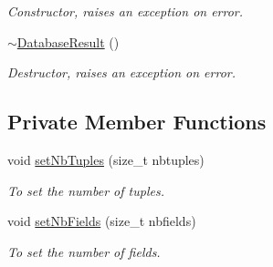 \begin{DoxyCompactItemize}
\begin{DoxyCompactList}\small\item\em Constructor, raises an exception on error. \item\end{DoxyCompactList}\item 
\hypertarget{classDatabaseResult_a67e279aafefdea3dcf1a61540dfa6c8b}{
\hyperlink{classDatabaseResult_a67e279aafefdea3dcf1a61540dfa6c8b}{$\sim$DatabaseResult} ()}
\label{classDatabaseResult_a67e279aafefdea3dcf1a61540dfa6c8b}

\begin{DoxyCompactList}\small\item\em Destructor, raises an exception on error. \item\end{DoxyCompactList}\end{DoxyCompactItemize}
\subsection*{Private Member Functions}
\begin{DoxyCompactItemize}
\item 
void \hyperlink{classDatabaseResult_a7ecbd6dcff94807ef336078f738b72d1}{setNbTuples} (size\_\-t nbtuples)
\begin{DoxyCompactList}\small\item\em To set the number of tuples. \item\end{DoxyCompactList}\item 
void \hyperlink{classDatabaseResult_a074e2368ec01570285d829478db73471}{setNbFields} (size\_\-t nbfields)
\begin{DoxyCompactList}\small\item\em To set the number of fields. \item\end{DoxyCompactList}\end{DoxyCompactItemize}
